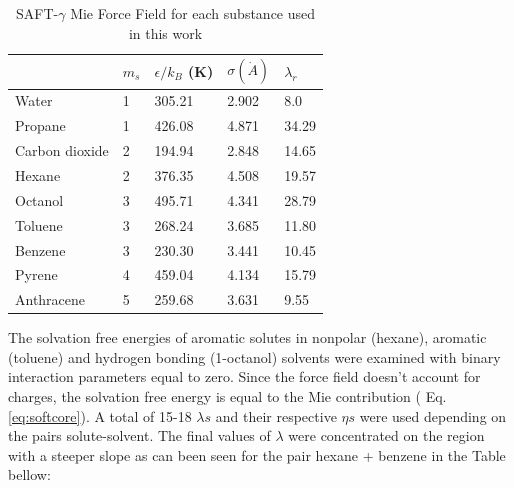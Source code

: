 \begin{table}[h]
\centering
  \caption{SAFT-$\gamma$ Mie Force Field for each substance used in this work}
  \label{tbl:parameters}
  \begin{tabular}{lllll}
  	\hline
  	               & $m_s$ & $\epsilon/k_{B}$ (K) & $\sigma (\dot{A})$ & $\lambda_r$ \\ \hline
  	Water          & 1     & 305.21               & 2.902              & 8.0         \\
  	Propane        & 1     & 426.08               & 4.871              & 34.29       \\
  	Carbon dioxide & 2     & 194.94               & 2.848              & 14.65       \\
  	Hexane         & 2     & 376.35               & 4.508              & 19.57       \\
  	Octanol        & 3     & 495.71               & 4.341              & 28.79       \\
  	Toluene        & 3     & 268.24               & 3.685              & 11.80       \\
  	Benzene        & 3     & 230.30               & 3.441              & 10.45       \\
  	Pyrene         & 4     & 459.04               & 4.134              & 15.79       \\
  	Anthracene     & 5     & 259.68               & 3.631              & 9.55        \\ \hline
  \end{tabular}

\end{table}

The solvation free energies of aromatic solutes in nonpolar (hexane), aromatic (toluene) and hydrogen bonding (1-octanol) solvents were examined with binary interaction parameters equal to zero. Since the force field doesn't account for charges, the solvation free energy is equal to the Mie contribution ( Eq. \eqref{eq:softcore}). A total of 15-18 $\lambda s$ and their respective $\eta s$ were used depending on the pairs solute-solvent. The final values of $\lambda$ were concentrated on the region with a steeper slope as can been seen for the pair hexane + benzene in the Table bellow:


